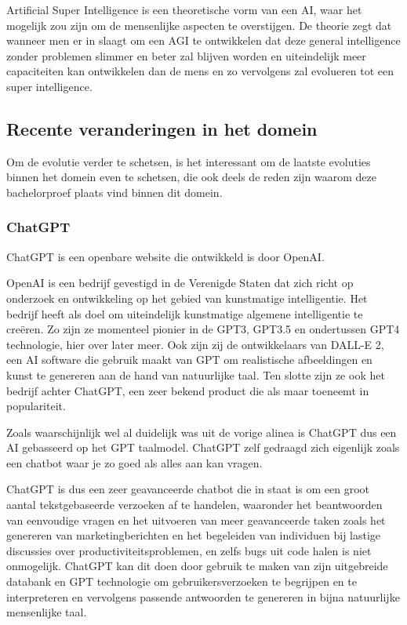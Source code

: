     Artificial Super Intelligence is een theoretische vorm van een AI, waar het mogelijk zou zijn om de mensenlijke aspecten te overstijgen. De theorie zegt dat wanneer men er in slaagt om een AGI te ontwikkelen dat deze general intelligence zonder problemen slimmer en beter zal blijven worden en uiteindelijk meer capaciteiten kan ontwikkelen dan de mens en zo vervolgens zal evolueren tot een super intelligence. 


\subsection{Recente veranderingen in het domein}

Om de evolutie verder te schetsen, is het interessant om de laatste evoluties binnen het domein even te schetsen, die ook deels de reden zijn waarom deze bachelorproef plaats vind binnen dit domein. 

\subsubsection{ChatGPT}
ChatGPT is een openbare website die ontwikkeld is door OpenAI.

OpenAI is een bedrijf gevestigd in de Verenigde Staten dat zich richt op onderzoek en ontwikkeling op het gebied van kunstmatige intelligentie. Het bedrijf heeft als doel om uiteindelijk kunstmatige algemene intelligentie te creëren. Zo zijn ze momenteel pionier in de GPT3, GPT3.5 en ondertussen GPT4 technologie, hier over later meer. Ook zijn zij de ontwikkelaars van DALL-E 2, een AI software die gebruik maakt van GPT om realistische afbeeldingen en kunst te genereren aan de hand van natuurlijke taal. Ten slotte zijn ze ook het bedrijf achter ChatGPT, een zeer bekend product die als maar toeneemt in populariteit.

Zoals waarschijnlijk wel al duidelijk was uit de vorige alinea is ChatGPT dus een AI gebasseerd op het GPT taalmodel. ChatGPT zelf gedraagd zich eigenlijk zoals een chatbot waar je zo goed als alles aan kan vragen.

ChatGPT is dus een zeer geavanceerde chatbot die in staat is om een groot aantal tekstgebaseerde verzoeken af te handelen, waaronder het beantwoorden van eenvoudige vragen en het uitvoeren van meer geavanceerde taken zoals het genereren van marketingberichten en het begeleiden van individuen bij lastige discussies over productiviteitsproblemen, en zelfs bugs uit code halen is niet onmogelijk. ChatGPT kan dit doen door gebruik te maken van zijn uitgebreide databank en GPT technologie om gebruikersverzoeken te begrijpen en te interpreteren en vervolgens passende antwoorden te genereren in bijna natuurlijke mensenlijke taal. 

